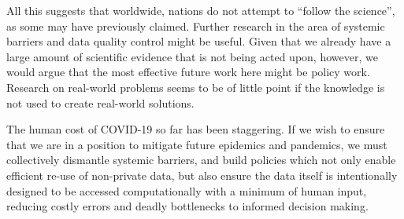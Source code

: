 \documentclass{CUP-JNL-DAP}%
\begin{document}
All this suggests that worldwide, nations do not attempt to “follow the science”, as some may have previously claimed. Further research in the area of systemic barriers and data quality control might be useful. Given that we already have a large amount of scientific evidence that is not being acted upon, however, we would argue that the most effective future work here might be policy work. Research on real-world problems seems to be of little point if the knowledge is not used to create real-world solutions.

The human cost of COVID-19 so far has been staggering. If we wish to ensure that we are in a position to mitigate future epidemics and pandemics, we must collectively dismantle systemic barriers, and build policies which not only enable efficient re-use of non-private data, but also ensure the data itself is intentionally designed to be accessed computationally with a minimum of human input, reducing costly errors and deadly bottlenecks to informed decision making. 
\end{document}
